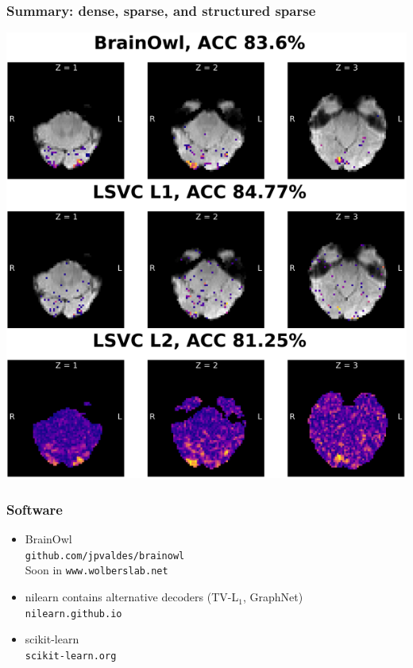 \documentclass[11pt]{beamer}
\begin{document}
\begin{frame}
    \frametitle{Summary: dense, sparse, and structured sparse}

    \begin{center}
        \includegraphics[scale=0.45]{figures/dense_sparse_structured-sparse.png}
    \end{center}
\end{frame}


\begin{frame}
    \frametitle{Software}
    \begin{itemize}
        \item BrainOwl \\ \texttt{github.com/jpvaldes/brainowl}
            \\ Soon in \texttt{www.wolberslab.net}
        \item nilearn contains alternative decoders (TV-L$_1$, GraphNet) \\ 
            \texttt{nilearn.github.io}
        \item scikit-learn \\ \texttt{scikit-learn.org}
    \end{itemize}
\end{frame}
\end{document}
